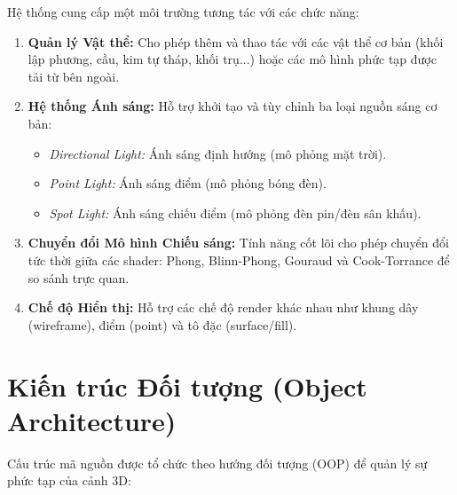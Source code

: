 Hệ thống cung cấp một môi trường tương tác với các chức năng:
\begin{enumerate}
	\item \textbf{Quản lý Vật thể:} Cho phép thêm và thao tác với các vật thể cơ bản (khối lập phương, cầu, kim tự tháp, khối trụ...) hoặc các mô hình phức tạp được tải từ bên ngoài.
	
	\item \textbf{Hệ thống Ánh sáng:} Hỗ trợ khởi tạo và tùy chỉnh ba loại nguồn sáng cơ bản:
	\begin{itemize}
		\item \textit{Directional Light:} Ánh sáng định hướng (mô phỏng mặt trời).
		
		\item \textit{Point Light:} Ánh sáng điểm (mô phỏng bóng đèn).
		
		\item \textit{Spot Light:} Ánh sáng chiếu điểm (mô phỏng đèn pin/đèn sân khấu).
	\end{itemize}
	
	\item \textbf{Chuyển đổi Mô hình Chiếu sáng:} Tính năng cốt lõi cho phép chuyển đổi tức thời giữa các shader: Phong, Blinn-Phong, Gouraud và Cook-Torrance để so sánh trực quan.
	
	\item \textbf{Chế độ Hiển thị:} Hỗ trợ các chế độ render khác nhau như khung dây (wireframe), điểm (point) và tô đặc (surface/fill).
\end{enumerate}

\section{Kiến trúc Đối tượng (Object Architecture)}

Cấu trúc mã nguồn được tổ chức theo hướng đối tượng (OOP) để quản lý sự phức tạp của cảnh 3D:

